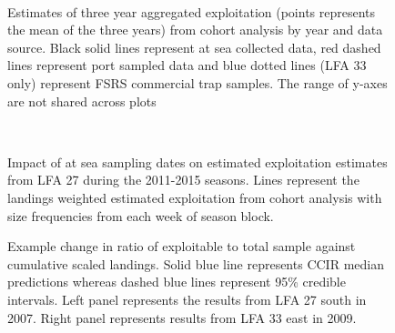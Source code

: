 \documentclass[11pt]{article}
\newcommand{\D}{.}
\newcommand{\e}{/SpinDr/backup/bio_data/bio.lobster/figures/} %
\begin{document}
\begin{figure}
        \centering
         \\
                    
                    \caption{Estimates of three year aggregated exploitation (points represents the mean of the three years) from cohort analysis by year and data source. Black solid lines represent at sea collected data, red dashed lines represent port sampled data and blue dotted lines (LFA 33 only) represent FSRS commercial trap samples. The range of y-axes are not shared across plots}
        \end{figure}


\begin{figure}
        \centering
         \\
                     \caption{Impact of at sea sampling dates on estimated exploitation estimates from LFA 27 during the 2011-2015 seasons. Lines represent the landings weighted estimated exploitation from cohort analysis with size frequencies from each week of season block.}
        \end{figure}


\begin{figure}
\centering
              \caption{Example change in ratio of exploitable to total sample against cumulative scaled landings. Solid blue line represents CCIR median predictions whereas dashed blue lines represent 95\% credible intervals. Left panel represents the results from LFA 27 south in 2007. Right panel represents results from LFA 33 east in 2009.}
\end{figure}
\end{document}
